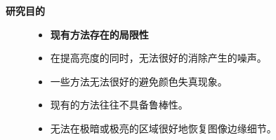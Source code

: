 \documentclass[CJK,aspectratio=169]{beamer}  %
\begin{document}
	\begin{frame}
		{ \yahei \textbf{研究目的}}
		
		\begin{figure}
		\begin{minipage}{.4\columnwidth}
			\begin{itemize}
				\item {} \yahei \textbf{现有方法存在的局限性}
				
				\item[\XSolidBrush]
				 \yahei 在提高亮度的同时，无法很好的消除产生的噪声。
				
				\item[\XSolidBrush]
				 \yahei 一些方法无法很好的避免颜色失真现象。
				
				\item[\XSolidBrush]
				 \yahei 现有的方法往往不具备鲁棒性。
				\item[\XSolidBrush]
				 \yahei 无法在极暗或极亮的区域很好地恢复图像边缘细节\textcolor{blue}{\citep{xu2023low}}。
				
				\vspace{0.2cm}
				

\end{itemize}
\end{minipage}
\end{figure}
\end{frame}
\end{document}
